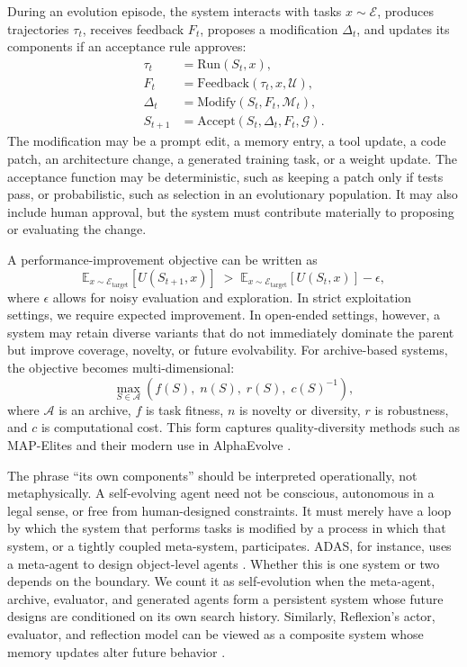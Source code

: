 During an evolution episode, the system interacts with tasks $x\sim\mathcal{E}$, produces trajectories $\tau_t$, receives feedback $F_t$, proposes a modification $\Delta_t$, and updates its components if an acceptance rule approves:
\begin{align}
\tau_t &= \mathrm{Run}(S_t, x), \\
F_t &= \mathrm{Feedback}(\tau_t, x, \mathcal{U}), \\
\Delta_t &= \mathrm{Modify}(S_t, F_t, \mathcal{M}_t), \\
S_{t+1} &= \mathrm{Accept}(S_t, \Delta_t, F_t, \mathcal{G}).
\end{align}
The modification may be a prompt edit, a memory entry, a tool update, a code patch, an architecture change, a generated training task, or a weight update. The acceptance function may be deterministic, such as keeping a patch only if tests pass, or probabilistic, such as selection in an evolutionary population. It may also include human approval, but the system must contribute materially to proposing or evaluating the change.

A performance-improvement objective can be written as
\begin{equation}
\mathbb{E}_{x\sim\mathcal{E}_{\mathrm{target}}}\left[ U(S_{t+1},x) \right]
\;>\;
\mathbb{E}_{x\sim\mathcal{E}_{\mathrm{target}}}\left[ U(S_t,x) \right] - \epsilon,
\end{equation}
where $\epsilon$ allows for noisy evaluation and exploration. In strict exploitation settings, we require expected improvement. In open-ended settings, however, a system may retain diverse variants that do not immediately dominate the parent but improve coverage, novelty, or future evolvability. For archive-based systems, the objective becomes multi-dimensional:
\begin{equation}
\max_{S\in\mathcal{A}} \left( f(S),\; n(S),\; r(S),\; c(S)^{-1} \right),
\end{equation}
where $\mathcal{A}$ is an archive, $f$ is task fitness, $n$ is novelty or diversity, $r$ is robustness, and $c$ is computational cost. This form captures quality-diversity methods such as MAP-Elites \cite{mouret2015illuminating} and their modern use in AlphaEvolve \cite{alphaevolve2025}.

The phrase ``its own components'' should be interpreted operationally, not metaphysically. A self-evolving agent need not be conscious, autonomous in a legal sense, or free from human-designed constraints. It must merely have a loop by which the system that performs tasks is modified by a process in which that system, or a tightly coupled meta-system, participates. ADAS, for instance, uses a meta-agent to design object-level agents \cite{adas2025}. Whether this is one system or two depends on the boundary. We count it as self-evolution when the meta-agent, archive, evaluator, and generated agents form a persistent system whose future designs are conditioned on its own search history. Similarly, Reflexion's actor, evaluator, and reflection model can be viewed as a composite system whose memory updates alter future behavior \cite{reflexion2023}.

